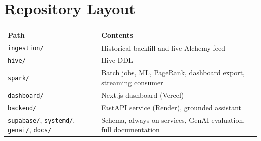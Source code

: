 \documentclass[11pt,a4paper]{article}
\let\oldsection\section
\renewcommand\section{\needspace{9\baselineskip}\oldsection}
\newcommand{\code}[1]{\texttt{\small #1}}
\begin{document}
\section*{Repository Layout}
\begin{tabularx}{\linewidth}{@{}>{\raggedright\arraybackslash}p{4.4cm}X@{}}
\toprule
\textbf{Path} & \textbf{Contents}\\
\midrule
\code{ingestion/} & Historical backfill and live Alchemy feed\\
\code{hive/} & Hive DDL\\
\code{spark/} & Batch jobs, ML, PageRank, dashboard export, streaming consumer\\
\code{dashboard/} & Next.js dashboard (Vercel)\\
\code{backend/} & FastAPI service (Render), grounded assistant\\
\code{supabase/}, \code{systemd/}, \code{genai/}, \code{docs/} & Schema, always-on services, GenAI evaluation, full documentation\\
\bottomrule
\end{tabularx}
\end{document}

